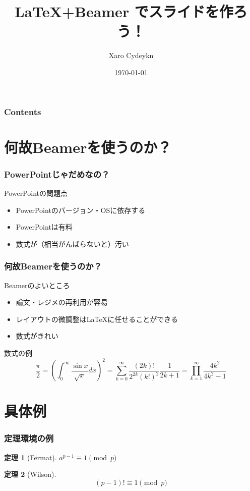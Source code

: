\documentclass[dvipdfmx,10pt,notheorems]{beamer}
\title[略タイトル]{\LaTeX +Beamer でスライドを作ろう！}%
\author[Xaro]{Xaro Cydeykn}%
\institute[JPN]{Tokyo, Japan}%
\date{\today}%
\theoremstyle{definition}
\newtheorem{theorem}{定理}
\begin{document}
\begin{frame}[plain]\frametitle{}
\titlepage %
\end{frame}

\begin{frame}\frametitle{Contents}
\tableofcontents %
\end{frame}

\section{何故Beamerを使うのか？}
\begin{frame}\frametitle{PowerPointじゃだめなの？}
\begin{alertblock}{PowerPointの問題点}
\begin{itemize}
\item PowerPointのバージョン・OSに依存する 
\item PowerPointは有料
\item 数式が（相当がんばらないと）汚い 
\end{itemize}
\end{alertblock}
\end{frame}

\begin{frame}\frametitle{何故Beamerを使うのか？}
\begin{block}{Beamerのよいところ}
\begin{itemize}
\item 論文・レジメの再利用が容易 
\item レイアウトの微調整は\LaTeX に任せることができる 
\item 数式がきれい 
\end{itemize}
\end{block}

\begin{exampleblock}{数式の例} 
\begin{equation*}
\frac{\pi}{2} =\left( \int_{0}^{\infty} \frac{\sin x}{\sqrt{x}} dx \right)^2 =\sum_{k=0}^{\infty} \frac{(2k)!}{2^{2k}(k!)^2} \frac{1}{2k+1} 
=\prod_{k=1}^{\infty} \frac{4k^2}{4k^2 - 1}
\end{equation*}
\end{exampleblock}
\end{frame}


\section{具体例}

\begin{frame}\frametitle{定理環境の例}
\begin{theorem}[Fermat]
$a^{p-1} \equiv 1 \pmod{p}$
\end{theorem}
\pause
\begin{theorem}[Wilson]
\begin{equation}
(p-1)! \equiv 1 \pmod{p}
\end{equation}
\end{theorem}
\end{frame}
\end{document}
